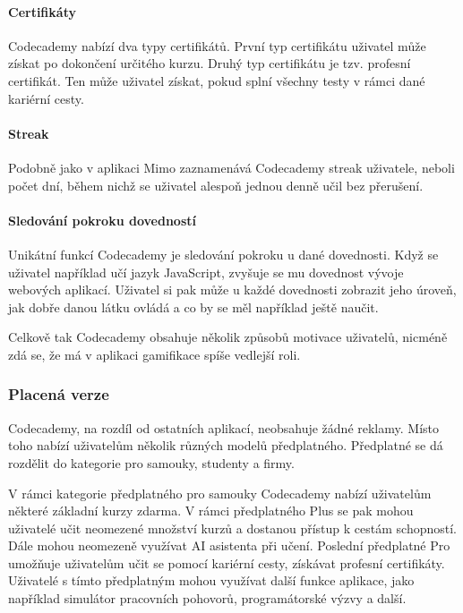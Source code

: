 \paragraph{Certifikáty} Codecademy nabízí dva typy certifikátů. První typ certifikátu uživatel může získat po dokončení určitého kurzu. Druhý typ certifikátu je tzv. profesní certifikát. Ten může uživatel získat, pokud splní všechny testy v rámci dané kariérní cesty.

\paragraph{Streak} Podobně jako v aplikaci Mimo zaznamenává Codecademy streak uživatele, neboli počet dní, během nichž se uživatel alespoň jednou denně učil bez přerušení.

\paragraph{Sledování pokroku dovedností} Unikátní funkcí Codecademy je sledování pokroku u dané dovednosti. Když se uživatel například učí jazyk JavaScript, zvyšuje se mu dovednost vývoje webových aplikací. Uživatel si pak může u každé dovednosti zobrazit jeho úroveň, jak dobře danou látku ovládá a co by se měl například ještě naučit.

Celkově tak Codecademy obsahuje několik způsobů motivace uživatelů, nicméně zdá se, že má v aplikaci gamifikace spíše vedlejší roli.

\subsubsection{Placená verze}

Codecademy, na rozdíl od ostatních aplikací, neobsahuje žádné reklamy. Místo toho nabízí uživatelům několik různých modelů předplatného. Předplatné se dá rozdělit do kategorie pro samouky, studenty a firmy.

V rámci kategorie předplatného pro samouky Codecademy nabízí uživatelům některé základní kurzy zdarma. V rámci předplatného Plus se pak mohou uživatelé učit neomezené množství kurzů a dostanou přístup k cestám schopností. Dále mohou neomezeně využívat AI asistenta při učení. Poslední předplatné Pro umožňuje uživatelům učit se pomocí kariérní cesty, získávat profesní certifikáty. Uživatelé s tímto předplatným mohou využívat další funkce aplikace, jako například simulátor pracovních pohovorů, programátorské výzvy a další.


